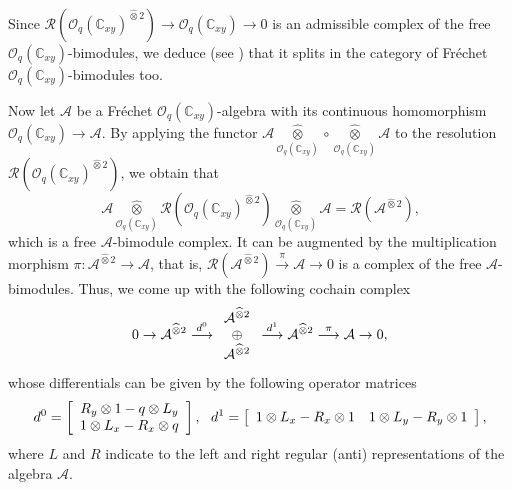 \documentclass[12pt,reqno]{amsart}%
\theoremstyle{plain}
\numberwithin{theorem}{section} \numberwithin{equation}{section}
\numberwithin{lemma}{section}
\numberwithin{remark}{section}
\numberwithin{example}{section}
\numberwithin{proposition}{section}
\numberwithin{definition}{section}
\numberwithin{corollary}{section}
\begin{document}
Since $\mathcal{R}\left(  \mathcal{O}_{q}\left(  \mathbb{C}_{xy}\right)
^{\widehat{\otimes}2}\right)  \rightarrow\mathcal{O}_{q}\left(  \mathbb{C}%
_{xy}\right)  \rightarrow0$ is an admissible complex of the free
$\mathcal{O}_{q}\left(  \mathbb{C}_{xy}\right)  $-bimodules, we deduce (see
\cite[3.1.18]{HelHom}) that it splits in the category of Fr\'{e}chet
$\mathcal{O}_{q}\left(  \mathbb{C}_{xy}\right)  $-bimodules too.

Now let $\mathcal{A}$ be a Fr\'{e}chet $\mathcal{O}_{q}\left(  \mathbb{C}%
_{xy}\right)  $-algebra with its continuous homomorphism $\mathcal{O}%
_{q}\left(  \mathbb{C}_{xy}\right)  \rightarrow\mathcal{A}$. By applying the
functor $\mathcal{A}\underset{\mathcal{O}_{q}\left(  \mathbb{C}_{xy}\right)
}{\widehat{\otimes}}\circ\underset{\mathcal{O}_{q}\left(  \mathbb{C}%
_{xy}\right)  }{\widehat{\otimes}}\mathcal{A}$ to the resolution
$\mathcal{R}\left(  \mathcal{O}_{q}\left(  \mathbb{C}_{xy}\right)
^{\widehat{\otimes}2}\right)  $, we obtain that
\[
\mathcal{A}\underset{\mathcal{O}_{q}\left(  \mathbb{C}_{xy}\right)
}{\widehat{\otimes}}\mathcal{R}\left(  \mathcal{O}_{q}\left(  \mathbb{C}%
_{xy}\right)  ^{\widehat{\otimes}2}\right)  \underset{\mathcal{O}_{q}\left(
\mathbb{C}_{xy}\right)  }{\widehat{\otimes}}\mathcal{A=R}\left(
\mathcal{A}^{\widehat{\otimes}2}\right)  \text{,}%
\]
which is a free $\mathcal{A}$-bimodule complex. It can be augmented by the
multiplication morphism $\pi:\mathcal{A}^{\widehat{\otimes}2}\rightarrow
\mathcal{A}$, that is, $\mathcal{R}\left(  \mathcal{A}^{\widehat{\otimes}%
2}\right)  \overset{\pi}{\longrightarrow}\mathcal{A}\rightarrow0$ is a complex
of the free $\mathcal{A}$-bimodules. Thus, we come up with the following
cochain complex
\begin{equation}
0\rightarrow\mathcal{A}^{\widehat{\otimes}2}\overset{d^{0}}{\longrightarrow}%
\begin{array}
[c]{c}%
\mathcal{A}^{\widehat{\otimes}2}\\
\oplus\\
\mathcal{A}^{\widehat{\otimes}2}%
\end{array}
\overset{d^{1}}{\longrightarrow}\mathcal{A}^{\widehat{\otimes}2}%
\overset{\pi}{\longrightarrow}\mathcal{A}\rightarrow0, \label{Rsp}%
\end{equation}
whose differentials can be given by the following operator matrices
\begin{equation}
d^{0}=\left[
\begin{array}
[c]{c}%
R_{y}\otimes1-q\otimes L_{y}\\
1\otimes L_{x}-R_{x}\otimes q
\end{array}
\right]  ,\text{ \ }d^{1}=\left[
\begin{array}
[c]{cc}%
1\otimes L_{x}-R_{x}\otimes1 & 1\otimes L_{y}-R_{y}\otimes1
\end{array}
\right]  , \label{d}%
\end{equation}
where $L$ and $R$ indicate to the left and right regular (anti)
representations of the algebra $\mathcal{A}$.
\end{document}
